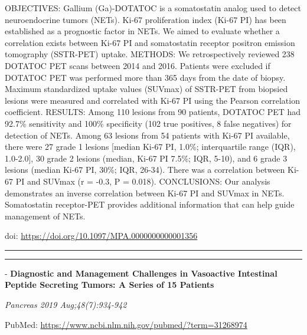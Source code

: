 \documentclass[]{article}
\begin{document}
OBJECTIVES: Gallium (Ga)-DOTATOC is a somatostatin analog used to detect
neuroendocrine tumors (NETs). Ki-67 proliferation index (Ki-67 PI) has
been established as a prognostic factor in NETs. We aimed to evaluate
whether a correlation exists between Ki-67 PI and somatostatin receptor
positron emission tomography (SSTR-PET) uptake. METHODS: We
retrospectively reviewed 238 DOTATOC PET scans between 2014 and 2016.
Patients were excluded if DOTATOC PET was performed more than 365 days
from the date of biopsy. Maximum standardized uptake values (SUVmax) of
SSTR-PET from biopsied lesions were measured and correlated with Ki-67
PI using the Pearson correlation coefficient. RESULTS: Among 110 lesions
from 90 patients, DOTATOC PET had 92.7\% sensitivity and 100\%
specificity (102 true positives, 8 false negatives) for detection of
NETs. Among 63 lesions from 54 patients with Ki-67 PI available, there
were 27 grade 1 lesions {[}median Ki-67 PI, 1.0\%; interquartile range
(IQR), 1.0-2.0{]}, 30 grade 2 lesions (median, Ki-67 PI 7.5\%; IQR,
5-10), and 6 grade 3 lesions (median Ki-67 PI, 30\%; IQR, 26-34). There
was a correlation between Ki-67 PI and SUVmax (r = -0.3, P = 0.018).
CONCLUSIONS: Our analysis demonstrates an inverse correlation between
Ki-67 PI and SUVmax in NETs. Somatostatin receptor-PET provides
additional information that can help guide management of NETs.

doi: \url{https://doi.org/10.1097/MPA.0000000000001356}

{}

{}

\begin{center}\rule{0.5\linewidth}{\linethickness}\end{center}

\begin{center}\rule{0.5\linewidth}{\linethickness}\end{center}

 - \textbf{Diagnostic and Management Challenges in Vasoactive Intestinal
Peptide Secreting Tumors: A Series of 15 Patients}

\emph{Pancreas 2019 Aug;48(7):934-942}

PubMed: \url{https://www.ncbi.nlm.nih.gov/pubmed/?term=31268974}
\end{document}
